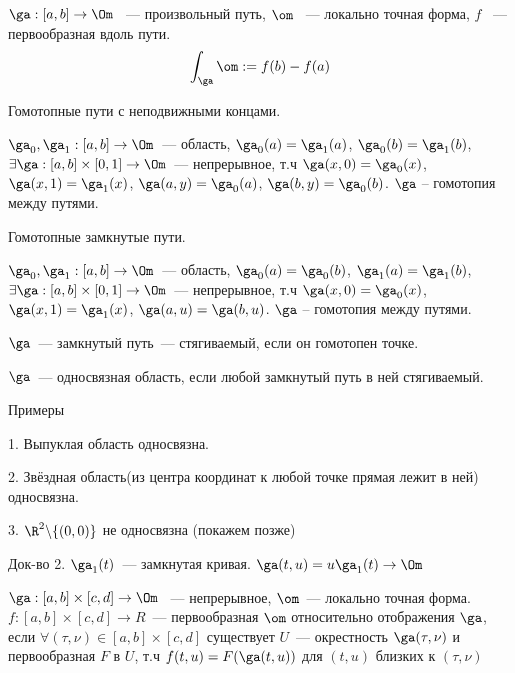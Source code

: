 \begin{definition}
    $\ga : [a, b] \to \Om$ ~--- произвольный путь,
    $\om$ ~--- локально точная форма,
    $f$ ~--- первообразная вдоль пути.
    \[ \int_{\ga} \om := f(b) - f(a)\]
\end{definition}

\begin{definition}
    Гомотопные пути с неподвижными концами.

    $\ga_0, \ga_1:[a, b] \to \Om$~--- область,
    $\ga_0(a) = \ga_1(a)$,
    $\ga_0(b) = \ga_1(b)$,
    $\exists{\ga}:[a, b] \times [0, 1] \to \Om$~--- непрерывное, т.ч
    $\ga(x, 0) = \ga_0(x)$, $\ga(x, 1) = \ga_1(x)$,
    $\ga(a, y) = \ga_0(a)$,
    $\ga(b, y) = \ga_0(b)$. $\ga$ -- гомотопия между путями.
\end{definition}


\begin{definition}
    Гомотопные замкнутые пути.

    $\ga_0, \ga_1:[a, b] \to \Om$~--- область,
    $\ga_0(a) = \ga_0(b)$,
    $\ga_1(a) = \ga_1(b)$,
    $\exists{\ga}:[a, b] \times [0, 1] \to \Om$~--- непрерывное, т.ч
    $\ga(x, 0) = \ga_0(x)$,  $\ga(x, 1) = \ga_1(x)$,
    $\ga(a, u) = \ga(b, u)$. $\ga$ -- гомотопия между путями.
\end{definition}

$\ga$~--- замкнутый путь~--- стягиваемый, если он гомотопен точке.

$\ga$~--- односвязная область, если любой замкнутый путь в ней стягиваемый.


Примеры

1. Выпуклая область односвязна.

2. Звёздная область(из центра координат к любой точке прямая лежит в ней) односвязна.

3. $\R^2 \backslash \{(0, 0)\}$ не односвязна (покажем позже)

Док-во 2. $\ga_1(t)$~--- замкнутая кривая. $\ga(t, u) = u \ga_1(t) \to\Om$


\begin{definition}
    $\ga:[a, b]\times[c, d] \to \Om$ ~--- непрерывное,
    $\om$~--- локально точная форма.
    $f:[a, b]\times [c, d] \to R$~--- первообразная $\om$ относительно отображения $\ga$, если
    $\forall{(\tau, \nu) \in[a,b] \times [c, d]}$ существует $U$~--- окрестность $\ga(\tau, \nu)$ и первообразная $F$ в $U$, т.ч
    $f(t, u) = F(\ga(t, u))$ для $(t, u)$ близких к $(\tau, \nu)$
\end{definition}

